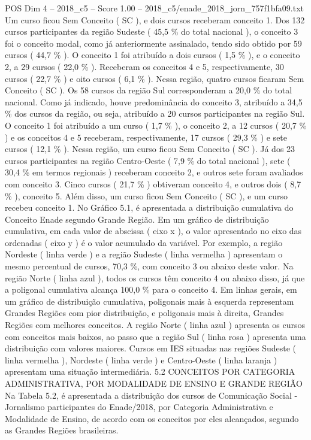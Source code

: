 \begin{textsample}{POS Dim 4 – 2018\_c5 – Score 1.00 – 2018\_c5/enade\_2018\_jorn\_757f1bfa09.txt}
Um curso ficou Sem Conceito ( SC ), e dois cursos receberam conceito 1.
Dos 132 cursos participantes da região Sudeste ( 45,5 \% do total nacional ), o conceito 3 foi o conceito modal, como já anteriormente assinalado, tendo sido obtido por 59 cursos ( 44,7 \% ).
O conceito 1 foi atribuído a dois cursos ( 1,5 \% ), e o conceito 2, a 29 cursos ( 22,0 \% ).
Receberam os conceitos 4 e 5, respectivamente, 30 cursos ( 22,7 \% ) e oito cursos ( 6,1 \% ).
Nessa região, quatro cursos ficaram Sem Conceito ( SC ).
Os 58 cursos da região Sul corresponderam a 20,0 \% do total nacional.
Como já indicado, houve predominância do conceito 3, atribuído a 34,5 \% dos cursos da região, ou seja, atribuído a 20 cursos participantes na região Sul.
O conceito 1 foi atribuído a um curso ( 1,7 \% ), o conceito 2, a 12 cursos ( 20,7 \% ) e os conceitos 4 e 5 receberam, respectivamente, 17 cursos ( 29,3 \% ) e sete cursos ( 12,1 \% ).
Nessa região, um curso ficou Sem Conceito ( SC ).
Já dos 23 cursos participantes na região Centro-Oeste ( 7,9 \% do total nacional ), sete ( 30,4 \% em termos regionais ) receberam conceito 2, e outros sete foram avaliados com conceito 3.
Cinco cursos ( 21,7 \% ) obtiveram conceito 4, e outros dois ( 8,7 \% ), conceito 5.
Além disso, um curso ficou Sem Conceito ( SC ), e um curso recebeu conceito 1.
No Gráfico 5.1, é apresentada a distribuição cumulativa do Conceito Enade segundo Grande Região.
Em um gráfico de distribuição cumulativa, em cada valor de abscissa ( eixo x ), o valor apresentado no eixo das ordenadas ( eixo y ) é o valor acumulado da variável.
Por exemplo, a região Nordeste ( linha verde ) e a região Sudeste ( linha vermelha ) apresentam o mesmo percentual de cursos, 70,3 \%, com conceito 3 ou abaixo deste valor.
Na região Norte ( linha azul ), todos os cursos têm conceito 4 ou abaixo disso, já que a poligonal cumulativa alcança 100,0 \% para o conceito 4.
Em linhas gerais, em um gráfico de distribuição cumulativa, poligonais mais à esquerda representam Grandes Regiões com pior distribuição, e poligonais mais à direita, Grandes Regiões com melhores conceitos.
A região Norte ( linha azul ) apresenta os cursos com conceitos mais baixos, ao passo que a região Sul ( linha rosa ) apresenta uma distribuição com valores maiores.
Cursos em IES situadas nas regiões Sudeste ( linha vermelha ), Nordeste ( linha verde ) e Centro-Oeste ( linha laranja ) apresentam uma situação intermediária. 5.2 CONCEITOS POR CATEGORIA ADMINISTRATIVA, POR MODALIDADE DE ENSINO E GRANDE REGIÃO Na Tabela 5.2, é apresentada a distribuição dos cursos de Comunicação Social - Jornalismo participantes do Enade/2018, por Categoria Administrativa e Modalidade de Ensino, de acordo com os conceitos por eles alcançados, segundo as Grandes Regiões brasileiras.

\end{textsample}
